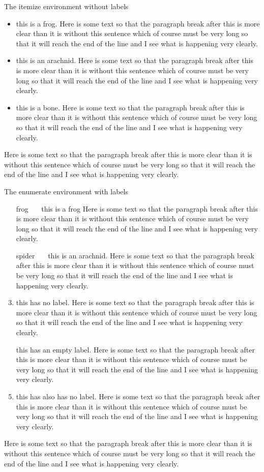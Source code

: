 \documentclass{article}
\begin{document}
The itemize environment without labels
\begin{itemize}
\item this is a frog. Here is some text so that the paragraph break after this
is more clear than it is without this sentence which of
course must be very long so that it will reach the end of
the line and I see what is happening very clearly.
\item this is an arachnid. Here is some text so that the paragraph break after this
is more clear than it is without this sentence which of
course must be very long so that it will reach the end of
the line and I see what is happening very clearly.
\item this is a bone. Here is some text so that the paragraph break after this
is more clear than it is without this sentence which of
course must be very long so that it will reach the end of
the line and I see what is happening very clearly.
\end{itemize}
Here is some text so that the paragraph break after this
is more clear than it is without this sentence which of
course must be very long so that it will reach the end of
the line and I see what is happening very clearly.


The enumerate environment with labels
\begin{enumerate}
\item[frog~~~] this is a frog Here is some text so that the paragraph break after this
is more clear than it is without this sentence which of
course must be very long so that it will reach the end of
the line and I see what is happening very clearly.
\item[spider~~~] this is an arachnid. Here is some text so that the paragraph break after this
is more clear than it is without this sentence which of
course must be very long so that it will reach the end of
the line and I see what is happening very clearly.
\item this has no label. Here is some text so that the paragraph break after this
is more clear than it is without this sentence which of
course must be very long so that it will reach the end of
the line and I see what is happening very clearly.
\item[] this has an empty label. Here is some text so that the paragraph break after this
is more clear than it is without this sentence which of
course must be very long so that it will reach the end of
the line and I see what is happening very clearly.
\item this has also has no label. Here is some text so that the paragraph break after this
is more clear than it is without this sentence which of
course must be very long so that it will reach the end of
the line and I see what is happening very clearly.
\end{enumerate}
Here is some text so that the paragraph break after this
is more clear than it is without this sentence which of
course must be very long so that it will reach the end of
the line and I see what is happening very clearly.
\end{document}
